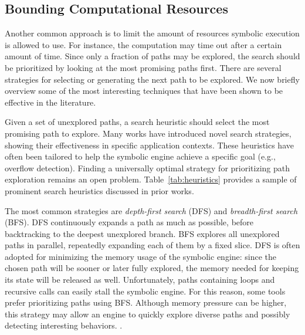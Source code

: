 \subsection{Bounding Computational Resources}
\label{ss:heuristics}

Another common approach is to limit the amount of resources symbolic execution is allowed to use. For instance, the computation may time out after a certain amount of time. Since only a fraction of paths may be explored, the search should be prioritized by looking at the most promising paths first. There are several strategies for selecting or generating the next path to be explored. We now briefly overview some of the most interesting techniques that have been shown to be effective in the literature. %


 Given a set of unexplored paths, a search heuristic should select the most promising path to explore. Many works have introduced novel search strategies, showing their effectiveness in specific application contexts. These heuristics have often been tailored to help the symbolic engine achieve a specific goal (e.g., overflow detection). Finding a universally optimal strategy for prioritizing path exploration remains an open problem. Table~\ref{tab:heuristics} provides a sample of prominent search heuristics discussed in prior works. 

The most common strategies are {\em depth-first search} (DFS) and {\em breadth-first search} (BFS). DFS continuously expands a path as much as possible, before backtracking to the deepest unexplored branch. BFS explores all unexplored paths in parallel, repeatedly expanding each of them by a fixed slice. DFS is often adopted for minimizing the memory usage of the symbolic engine: since the chosen path will be sooner or later fully explored, the memory needed for keeping its state will be released as well. Unfortunately, paths containing loops and recursive calls can easily stall the symbolic engine. For this reason, some tools prefer prioritizing paths using BFS. Although memory pressure can be higher, this strategy may allow an engine to quickly explore diverse paths and possibly detecting interesting behaviors. .


